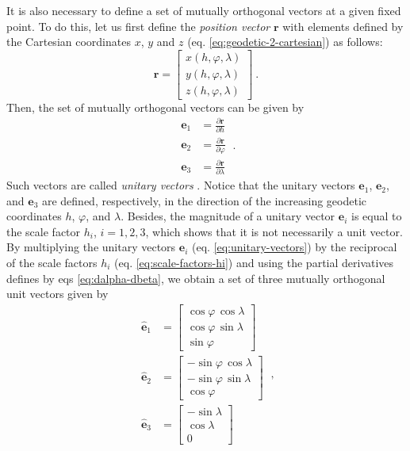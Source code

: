 \documentclass[mreferee]{gji}
\begin{document}
It is also necessary to define a set of mutually orthogonal vectors at
a given fixed point.
To do this, let us first define the \textit{position vector} 
$\mathbf{r}$ with elements defined by the Cartesian coordinates
$x$, $y$ and $z$ (eq. \ref{eq:geodetic-2-cartesian}) as follows:
\begin{equation} \label{eq:position-vector}
\mathbf{r} = \begin{bmatrix}
x(h, \varphi, \lambda) \\
y(h, \varphi, \lambda) \\
z(h, \varphi, \lambda)
\end{bmatrix} \: .
\end{equation}
Then, the set of mutually orthogonal vectors can be
given by
\begin{equation} \label{eq:unitary-vectors}
\begin{split}
\mathbf{e}_{1} &= \frac{\partial \mathbf{r}}{\partial h} \\
\mathbf{e}_{2} &= \frac{\partial \mathbf{r}}{\partial \varphi} \\
\mathbf{e}_{3} &= \frac{\partial \mathbf{r}}{\partial \lambda}
\end{split} \: .
\end{equation}
Such vectors are called \textit{unitary vectors} \citep{sttraton2007}.
Notice that the unitary vectors $\mathbf{e}_{1}$, $\mathbf{e}_{2}$, and $\mathbf{e}_{3}$
are defined, respectively, in the direction of the increasing geodetic coordinates
$h$, $\varphi$, and $\lambda$.
Besides, the magnitude of a unitary vector $\mathbf{e}_{i}$ is equal to
the scale factor $h_{i}$, $i = 1, 2, 3$,
which shows that it is not necessarily a unit vector.
By multiplying the unitary vectors $\mathbf{e}_{i}$ (eq. \ref{eq:unitary-vectors})
by the reciprocal of the scale factors $h_{i}$ (eq. \ref{eq:scale-factors-hi})
and using the partial derivatives defines by eqs \ref{eq:dalpha-dbeta},
we obtain a set of three mutually orthogonal unit vectors given by \citep{soler1976}
\begin{equation} \label{eq:unit-vectors}
\begin{split}
\hat{\mathbf{e}}_{1} &= 
\begin{bmatrix}
\cos\varphi \, \cos\lambda \\
\cos\varphi \, \sin\lambda \\
\sin\varphi
\end{bmatrix} \\
\hat{\mathbf{e}}_{2} &= 
\begin{bmatrix}
-\sin\varphi \, \cos\lambda \\
-\sin\varphi \, \sin\lambda \\
\cos\varphi
\end{bmatrix} \\
\hat{\mathbf{e}}_{3} &= 
\begin{bmatrix}
-\sin\lambda \\
\cos\lambda \\
0
\end{bmatrix}
\end{split} \: ,
\end{equation}
\end{document}
